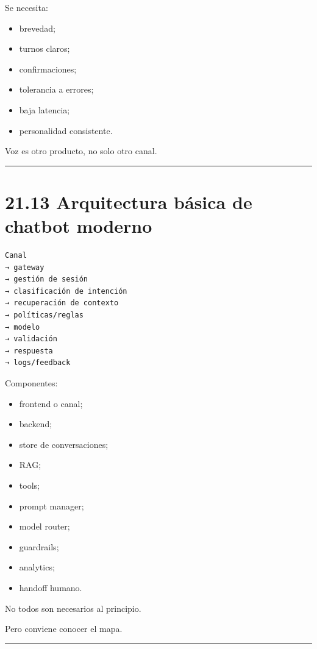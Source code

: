 Se necesita:

\begin{itemize}
\tightlist
\item
  brevedad;
\item
  turnos claros;
\item
  confirmaciones;
\item
  tolerancia a errores;
\item
  baja latencia;
\item
  personalidad consistente.
\end{itemize}

Voz es otro producto, no solo otro canal.

\begin{center}\rule{0.5\linewidth}{0.5pt}\end{center}

\section{21.13 Arquitectura básica de chatbot
moderno}\label{arquitectura-buxe1sica-de-chatbot-moderno}

\begin{lstlisting}
Canal
→ gateway
→ gestión de sesión
→ clasificación de intención
→ recuperación de contexto
→ políticas/reglas
→ modelo
→ validación
→ respuesta
→ logs/feedback
\end{lstlisting}

Componentes:

\begin{itemize}
\tightlist
\item
  frontend o canal;
\item
  backend;
\item
  store de conversaciones;
\item
  RAG;
\item
  tools;
\item
  prompt manager;
\item
  model router;
\item
  guardrails;
\item
  analytics;
\item
  handoff humano.
\end{itemize}

No todos son necesarios al principio.

Pero conviene conocer el mapa.

\begin{center}\rule{0.5\linewidth}{0.5pt}\end{center}

